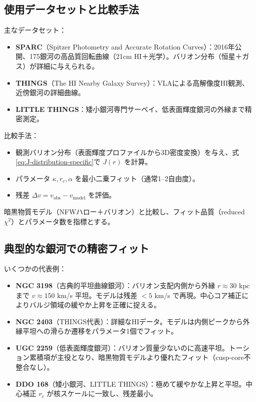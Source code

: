 \documentclass[dvipdfmx,a4paper]{jsbook}
\theoremstyle{definition}
\theoremstyle{remark}
\begin{document}
\subsection{使用データセットと比較手法}

主なデータセット：
\begin{itemize}
  \item \textbf{SPARC}（Spitzer Photometry and Accurate Rotation Curves）：2016年公開、175銀河の高品質回転曲線（21cm HI＋光学）。バリオン分布（恒星＋ガス）が詳細に与えられる。
  \item \textbf{THINGS}（The HI Nearby Galaxy Survey）：VLAによる高解像度HI観測、近傍銀河の詳細曲線。
  \item \textbf{LITTLE THINGS}：矮小銀河専門サーベイ、低表面輝度銀河の外縁まで精密測定。
\end{itemize}

比較手法：
\begin{itemize}
  \item 観測バリオン分布（表面輝度プロファイルから3D密度変換）を与え、式\eqref{eq:J-distribution-specific}で $J(r)$ を計算。
  \item パラメータ $\kappa, r_c, \alpha$ を最小二乗フィット（通常1--2自由度）。
  \item 残差 $\Delta v = v_\text{obs} - v_\text{model}$ を評価。
\end{itemize}

暗黒物質モデル（NFWハロー＋バリオン）と比較し、フィット品質（reduced $\chi^2$）とパラメータ数を指標とする。

\subsection{典型的な銀河での精密フィット}

いくつかの代表例：
\begin{itemize}
  \item \textbf{NGC 3198}（古典的平坦曲線銀河）：バリオン支配内側から外縁 $r \approx 30$ kpcまで $v \approx 150$ km/s 平坦。モデルは残差 $<5$ km/s で再現。中心コア補正によりバルジ領域の緩やか上昇を正確に捉える。
  \item \textbf{NGC 2403}（THINGS代表）：詳細なHIデータ。モデルは内側ピークから外縁平坦への滑らか遷移をパラメータ1個でフィット。
  \item \textbf{UGC 2259}（低表面輝度銀河）：バリオン質量少ないのに高速平坦。トーション累積項が主役となり、暗黒物質モデルより優れたフィット（cusp-core不整合なし）。
  \item \textbf{DDO 168}（矮小銀河、LITTLE THINGS）：極めて緩やかな上昇と平坦。中心補正 $r_c$ が核スケールに一致し、残差最小。
\end{itemize}
\end{document}
